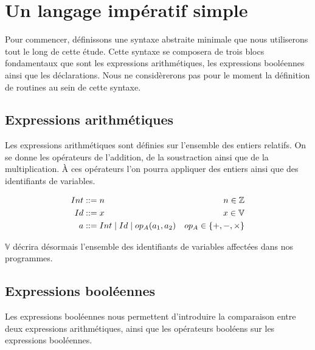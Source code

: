 \documentclass[a4paper, 10pt]{article}
\begin{document}
\section{Un langage impératif simple}
Pour commencer, définissons une syntaxe abstraite minimale que nous utiliserons tout le long de cette étude.
Cette syntaxe se composera de trois blocs fondamentaux que sont les expressions arithmétiques, les expressions
booléennes ainsi que les déclarations. Nous ne considèrerons pas pour le moment la définition de routines au sein de cette syntaxe.

\subsection{Expressions arithmétiques}
Les expressions arithmétiques sont définies sur l'ensemble des entiers relatifs. On se donne les opérateurs
de l'addition, de la soustraction ainsi que de la multiplication. À ces opérateurs l'on pourra appliquer des
entiers ainsi que des identifiants de variables.

\begin{align*}
  Int   & ::= n                               & n \in \mathbb{Z}          \\
  Id    & ::= x	  							  & x \in \mathbb{V}          \\
  a & ::= Int \mid Id \mid op_A(a_1, a_2) & op_A \in \{+, -, \times\}
\end{align*}


$\mathbb{V}$ décrira désormais l'ensemble des identifiants de variables affectées dans nos programmes. 
\subsection{Expressions booléennes}
Les expressions booléennes nous permettent d'introduire la comparaison entre deux expressions arithmétiques,
ainsi que les opérateurs booléens sur les expressions booléennes.

\begin{dtype}{\boolexp}
  \\
\end{dtype}
\end{document}
